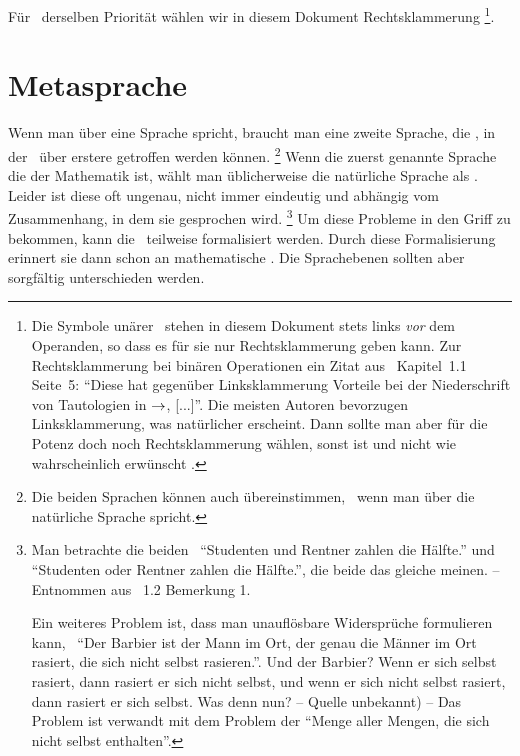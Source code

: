Für \Operationen\ derselben Priorität wählen wir in diesem Dokument Rechtsklammerung%
\footnote{%
	Die Symbole unärer \Operationen\ stehen in diesem Dokument stets links \emph{vor} dem Operanden, so dass es für sie nur Rechtsklammerung geben kann.
	Zur Rechtsklammerung bei binären Operationen ein Zitat aus~\cite{bib:Rautenberg} Kapitel~1.1 Seite~5:
	\enquote{Diese hat gegenüber Linksklammerung Vorteile bei der Niederschrift von Tautologien in $\rightarrow$, [...]}.
	Die meisten Autoren bevorzugen Linksklammerung, was natürlicher erscheint.
	Dann sollte man aber für die Potenz doch noch Rechtsklammerung wählen, sonst ist  und nicht wie wahrscheinlich erwünscht .
}.

\section{Metasprache}%
\label{sec:Metasprache}

Wenn man über eine Sprache spricht, braucht man eine zweite Sprache, die , in der \Aussagen\ über erstere getroffen werden können.%
\footnote{%
	Die beiden Sprachen können auch übereinstimmen, \textzB\ wenn man über die natürliche Sprache spricht.
}
Wenn die zuerst genannte Sprache die der Mathematik ist, wählt man üblicherweise die natürliche Sprache als \Metasprache.
Leider ist diese oft ungenau, nicht immer eindeutig und abhängig vom Zusammenhang, in dem sie gesprochen wird.%
\footnote{%
	Man betrachte die beiden \Aussagen\ \enquote{Studenten und Rentner zahlen die Hälfte.} und \enquote{Studenten oder Rentner zahlen die Hälfte.}, die beide das gleiche meinen.
	-- Entnommen aus \cite{bib:Rautenberg} \sectionname~1.2 Bemerkung 1.

	Ein weiteres Problem ist, dass man unauflösbare Widersprüche formulieren kann, \textzB\ \enquote{Der Barbier ist der Mann im Ort, der genau die Männer im Ort rasiert, die sich nicht selbst rasieren.}.
	Und der Barbier?
	Wenn er sich selbst rasiert, dann rasiert er sich nicht selbst, und wenn er sich nicht selbst rasiert, dann rasiert er sich selbst.
	Was denn nun?
	-- Quelle unbekannt) --
	Das Problem ist verwandt mit dem Problem der \enquote{Menge aller Mengen, die sich nicht selbst enthalten}.
}
Um diese Probleme in den Griff zu bekommen, kann die \Metasprache\ teilweise formalisiert werden.
Durch diese Formalisierung erinnert sie dann schon an mathematische \Formeln.
Die Sprachebenen sollten aber sorgfältig unterschieden werden.

